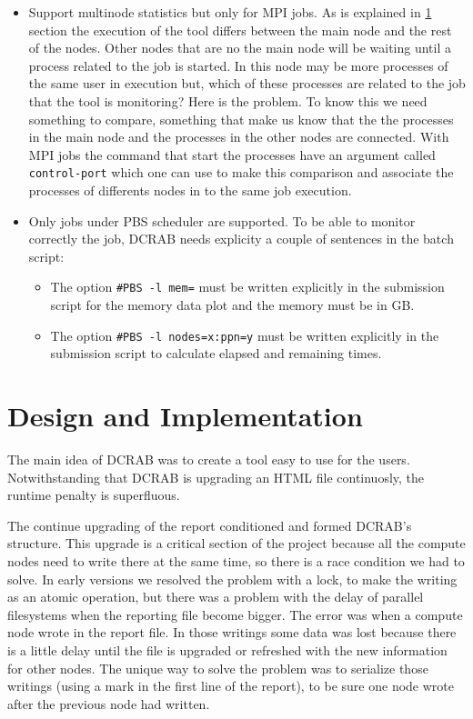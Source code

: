 \documentclass[10pt,a4paper]{report}
\begin{document}
\begin{itemize}
  \item Support multinode statistics but only for MPI jobs. As is explained in \ref{designAndImplementation} section the execution of the tool differs between the main node and the rest of the nodes. Other nodes that are no the main node will be waiting until a process related to the job is started. In this node may be more processes of the same user in execution but, which of these processes are related to the job that the tool is monitoring? Here is the problem. To know this we need something to compare, something that make us know that the the processes in the main node and the processes in the other nodes are connected. With MPI jobs the command that start the processes have an argument called \verb+control-port+ which one can use to make this comparison and associate the processes of differents nodes in to the same job execution.
  \item Only jobs under PBS scheduler are supported. To be able to monitor correctly the job, DCRAB needs explicity a couple of sentences in the batch script:
  \begin{itemize}
    \item The option \verb+#PBS -l mem=+ must be written explicitly in the submission script for the memory data plot and the memory must be in GB.
    \item The option \verb+#PBS -l nodes=x:ppn=y+ must be written explicitly in the submission script to calculate elapsed and remaining times.
  \end{itemize}
\end{itemize}

\chapter{Design and Implementation}
\label{designAndImplementation}
The main idea of DCRAB was to create a tool easy to use for the users. Notwithstanding that DCRAB is upgrading an HTML file continuosly, the runtime penalty is superfluous.

The continue upgrading of the report conditioned and formed DCRAB's structure. This upgrade is a critical section of the project because all the compute nodes need to write there at the same time, so there is a race condition we had to solve. In early versions we resolved the problem with a lock, to make the writing as an atomic operation, but there was a problem with the delay of parallel filesystems when the reporting file become bigger. The error was when a compute node wrote in the report file. In those writings some data was lost because there is a little delay until the file is upgraded or refreshed with the new information for other nodes. The unique way to solve the problem was to serialize those writings (using a mark in the first line of the report), to be sure one node wrote after the previous node had written.
\end{document}

